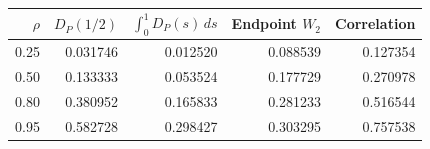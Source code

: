 \begin{tabular}{rrrrr}
\toprule
$\rho$ & $D_P(1/2)$ & $\int_0^1D_P(s)\,ds$ & Endpoint $W_2$ & Correlation \\
\midrule
0.25 & 0.031746 & 0.012520 & 0.088539 & 0.127354 \\
0.50 & 0.133333 & 0.053524 & 0.177729 & 0.270978 \\
0.80 & 0.380952 & 0.165833 & 0.281233 & 0.516544 \\
0.95 & 0.582728 & 0.298427 & 0.303295 & 0.757538 \\
\bottomrule
\end{tabular}
